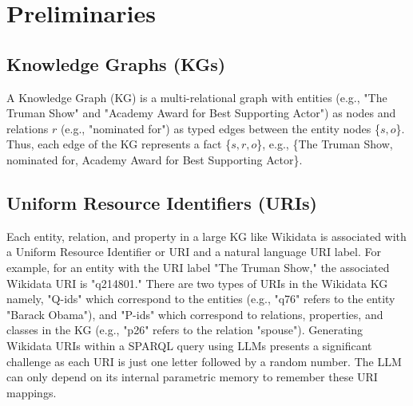 \section{Preliminaries}
\label{sec:prelims}

\subsection{Knowledge Graphs (KGs)}
\label{sec:kg}
A Knowledge Graph (KG) is a multi-relational graph with entities (e.g., "The Truman Show" and "Academy Award for Best Supporting Actor") as nodes and relations $r$ (e.g., "nominated for") as typed edges between the entity nodes \{$s, o$\}. Thus, each edge of the KG represents a fact \{$s, r, o$\}, e.g., \{The Truman Show, nominated for, Academy Award for Best Supporting Actor\}.

\subsection{Uniform Resource Identifiers (URIs)}
\label{sec:uri}
Each entity, relation, and property in a large KG like Wikidata is associated with a Uniform Resource Identifier or URI and a natural language URI label. For example, for an entity with the URI label "The Truman Show," the associated Wikidata URI is "q214801." There are two types of URIs in the Wikidata KG namely, "Q-ids" which correspond to the entities (e.g., "q76" refers to the entity "Barack Obama"), and "P-ids" which correspond to relations, properties, and classes in the KG (e.g., "p26" refers to the relation "spouse").
Generating Wikidata URIs within a SPARQL query using LLMs presents a significant challenge as each URI is just one letter followed by a random number. The LLM can only depend on its internal parametric memory to remember these URI mappings.


